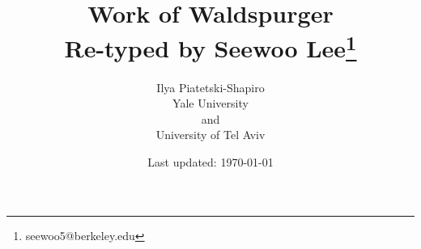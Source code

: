\documentclass[letterpaper, 12pt]{article}
\newcommand{\1}{\mathds{1}}	%
\theoremstyle{definition}
\begin{document}

\title{Work of Waldspurger \\[1em]
\normalsize Re-typed by Seewoo Lee\footnote{seewoo5@berkeley.edu}}


\author{Ilya Piatetski-Shapiro \\ Yale University \\ and \\ University of Tel Aviv}
\date{\normalsize\vspace{-1ex} Last updated: \today}


\maketitle
\tableofcontents\label{sec:contents}


% 
















\end{document}
